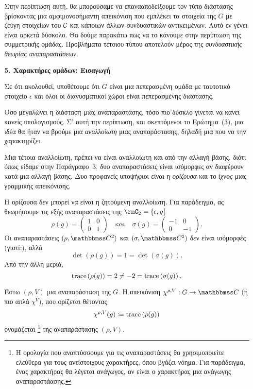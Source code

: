 \documentclass[12pt,a4paper,reqno]{amsart}
\newcommand{\defn}[1]{{\color{mylightblue}{#1}}}
\begin{document}
Στην περίπτωση αυτή, θα μπορούσαμε να επανααποδείξουμε τον τύπο διάστασης βρίσκοντας μια αμφιμονοσήμαντη απεικόνιση που εμπλέκει τα στοιχεία της $G$ με ζεύγη στοιχείων του $\mathcal{C}$ και κάποιων άλλων συνδυαστικών αντικειμένων. Αυτό εν γένει είναι αρκετά δύσκολο. Θα δούμε παρακάτω πως να το κάνουμε στην περίπτωση της συμμετρικής ομάδας. Προβλήματα τέτοιου τύπου αποτελούν μέρος της \emph{συνδυαστικής θεωρίας αναπαραστάσεων}.

\newpage 

\setcounter{section}{5}
\setcounter{theorem}{0}
\begin{center}
    \textbf{5. Χαρακτήρες ομάδων: Εισαγωγή
}
\end{center}

Σε ότι ακολουθεί, υποθέτουμε ότι $G$ είναι μια πεπερασμένη ομάδα με ταυτοτικό στοιχείο $\epsilon$ και όλοι οι διανυσματικοί χώροι είναι πεπερασμένης διάστασης.

Όσο μεγαλώνει η διάσταση μιας αναπαραστάσης, τόσο πιο δύσκλο γίνεται να κάνει κανείς υπολογισμούς. Σ' αυτή την περίπτωση, και σκεπτόμενοι το Ερώτημα~(3), μια ιδέα θα ήταν να βρούμε μια \emph{αναλλοίωτη} μιας αναπαράστασης, δηλαδή μια  που να την χαρακτηρίζει.

Μια τέτοια αναλλοίωτη, πρέπει να είναι αναλλοίωτη και από την αλλαγή βάσης, διότι όπως είδαμε στην Παράγραφο~3, δυο αναπαραστάσεις είναι ισόμορφες αν διαφέρουν κατά μια αλλαγή βάσης. Δυο προφανείς υποψήφιοι είναι η \emph{ορίζουσα} και το \emph{ίχνος} μιας γραμμικής απεικόνισης.

Η ορίζουσα δεν μπορεί να είναι η ζητούμενη αναλλοίωτη. Για παράδειγμα, ας θεωρήσουμε τις εξής αναπαραστάσεις της $\rmC_2 = \{\epsilon, g\}$
\[
    \rho(g) = 
        \begin{pmatrix}
            1 & 0 \\
            0 & 1
        \end{pmatrix} 
    \quad 
    \text{και}
    \quad
    \sigma(g) = 
        \begin{pmatrix}
            -1 & 0 \\
            0 & -1
        \end{pmatrix}.
\]
Οι αναπαραστάσεις $(\rho, \CC^2)$ και $(\sigma, \CC^2)$ δεν είναι ισόμορφές (γιατί;), αλλά 
\[
\det\left(\rho(g)\right) = 1 = \det\left(\sigma(g)\right).
\]
Από την άλλη μεριά,
\[
\mathrm{trace}\left(\rho(g)\right) = 2 \neq -2 = \mathrm{trace}\left(\sigma(g)\right).
\]

\begin{definition}
    \label{def:character}
    Έστω $(\rho,V)$ μια αναπαράσταση της $G$. Η απεικόνιση $\chi^{\rho,V} : G \to \CC$ (ή πιο απλά $\chi^V$), που ορίζεται θέτοντας 
    \[
    \chi^{\rho,V}(g) \coloneqq \mathrm{trace}\left(\rho(g)\right)
    \]
    ονομάζεται \defn{χαρακτήρας}\footnote{Η ορολογία που αναπτύσσουμε για τις αναπαραστάσεις θα χρησιμοποιείτε ελεύθερα για τους αντίστοιχους χαρακτήρες, όπου βγάζει νόημα. Για παράδειγμα, ένας χαρακτήρας θα λέγεται ανάγωγος, αν είναι ο χαρακτήρας μια ανάγωγης αναπαραστάασης.} της αναπαράστασης $(\rho,V)$.
\end{definition}
\end{document}

